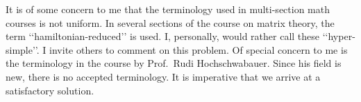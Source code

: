 \documentclass{article}
\begin{document}
It is of some concern to me that
the terminology used in multi-section
math courses is not uniform.
In several sections of the course on
matrix theory, the term
‘‘hamiltonian-reduced’’ is used.
I, personally, would rather call these ‘‘hyper-simple’’. I
invite others to comment on this problem.
Of special concern to me is the terminology in the course
by Prof.~Rudi Hochschwabauer.
Since his field is new, there is
no accepted
terminology. It is imperative
that we arrive at a satisfactory solution.
\end{document}
